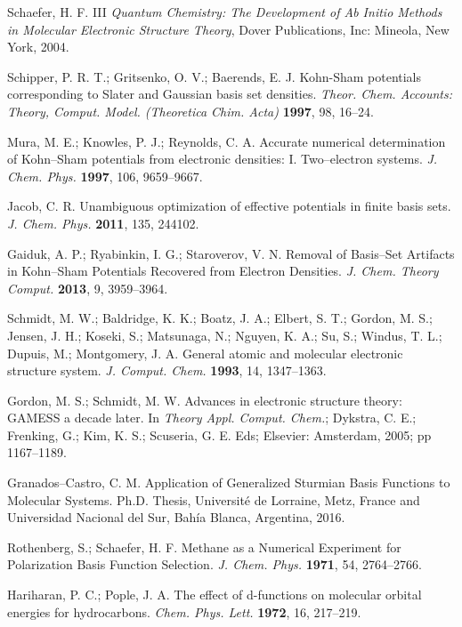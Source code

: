 \documentclass[10pt]{article}
\begin{document}
\begin{thebibliography}{10}
Schaefer, H. F. III
{\it Quantum Chemistry: The Development of Ab Initio Methods in
Molecular Electronic Structure Theory},
Dover Publications, Inc: Mineola, New York, 2004.

Schipper, P. R. T.; Gritsenko, O. V.; Baerends, E. J. 
Kohn-Sham potentials corresponding to Slater and Gaussian basis set densities.
{\it Theor. Chem. Accounts: Theory, Comput. Model. (Theoretica Chim. Acta)} {\bf 1997}, 98, 16--24.

Mura, M. E.; Knowles, P. J.; Reynolds, C. A.
Accurate numerical determination of Kohn--Sham potentials from electronic densities: I. Two--electron systems.
{\it J. Chem. Phys.} {\bf 1997}, 106, 9659--9667.

Jacob, C. R. 
Unambiguous optimization of effective potentials in finite basis sets.
{\it J. Chem. Phys.} {\bf 2011}, 135, 244102.

Gaiduk, A. P.; Ryabinkin, I. G.; Staroverov, V. N.
Removal of Basis--Set Artifacts in Kohn--Sham Potentials Recovered from Electron Densities.
{\it J. Chem. Theory Comput.} {\bf 2013}, 9, 3959--3964.

Schmidt, M. W.; Baldridge, K. K.; Boatz, J. A.; Elbert, S. T.; Gordon, M. S.; Jensen, J. H.; Koseki, S.;
Matsunaga, N.; Nguyen, K. A.; Su, S.; Windus, T. L.; Dupuis, M.; Montgomery, J. A.
General atomic and molecular electronic structure system.
{\it J. Comput. Chem.} {\bf 1993}, 14, 1347--1363.

Gordon, M. S.; Schmidt, M. W.
Advances in electronic structure theory: GAMESS a decade later. 
In {\it Theory Appl. Comput. Chem.}; 
Dykstra, C. E.; Frenking, G.; Kim, K. S.; Scuseria, G. E. Eds;
Elsevier: Amsterdam, 2005; pp 1167--1189.

Granados--Castro, C. M.
Application of Generalized Sturmian Basis Functions to Molecular Systems.
Ph.D. Thesis, Université de Lorraine, Metz, France and 
Universidad Nacional del Sur, Bahía Blanca, Argentina, 2016.

Rothenberg, S.; Schaefer, H. F.
Methane as a Numerical Experiment for Polarization Basis Function Selection.
{\it J. Chem. Phys.} {\bf 1971}, 54, 2764--2766.

Hariharan, P. C.; Pople, J. A.
The effect of d-functions on molecular orbital energies for hydrocarbons.
{\it Chem. Phys. Lett.} {\bf 1972}, 16, 217--219.


\end{thebibliography}
\end{document}
